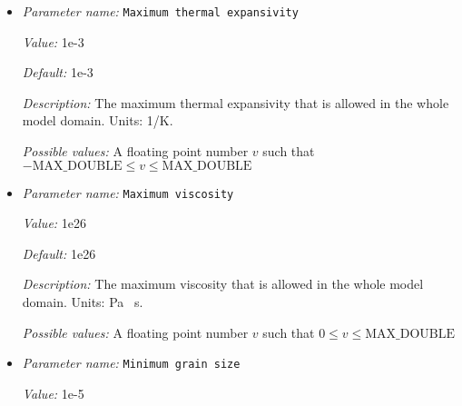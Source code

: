 \begin{itemize}
{\it Default:} 100


{\it Description:} The factor by which viscosity at adiabatic temperature and ambient temperature are allowed to differ (a value of x means that the viscosity can be x times higher or x times lower compared to the value at adiabatic temperature. This parameter is introduced to limit local viscosity contrasts, but still allow for a widely varying viscosity over the whole mantle range. Units: none.


{\it Possible values:} A floating point number $v$ such that $0 \leq v \leq \text{MAX\_DOUBLE}$
\item {\it Parameter name:} {\tt Maximum thermal expansivity}
\label{parameters:Material model/Grain size model/Maximum thermal expansivity}
\label{parameters:Material_20model/Grain_20size_20model/Maximum_20thermal_20expansivity}


{\it Value:} 1e-3


{\it Default:} 1e-3


{\it Description:} The maximum thermal expansivity that is allowed in the whole model domain. Units: 1/K.


{\it Possible values:} A floating point number $v$ such that $-\text{MAX\_DOUBLE} \leq v \leq \text{MAX\_DOUBLE}$
\item {\it Parameter name:} {\tt Maximum viscosity}
\label{parameters:Material model/Grain size model/Maximum viscosity}
\label{parameters:Material_20model/Grain_20size_20model/Maximum_20viscosity}


{\it Value:} 1e26


{\it Default:} 1e26


{\it Description:} The maximum viscosity that is allowed in the whole model domain. Units: Pa \, s.


{\it Possible values:} A floating point number $v$ such that $0 \leq v \leq \text{MAX\_DOUBLE}$
\item {\it Parameter name:} {\tt Minimum grain size}
\label{parameters:Material model/Grain size model/Minimum grain size}
\label{parameters:Material_20model/Grain_20size_20model/Minimum_20grain_20size}


{\it Value:} 1e-5



\end{itemize}
